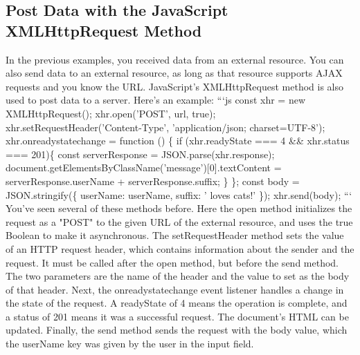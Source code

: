 \documentclass{article}%
\begin{document}
%
\subsection{Post Data with the JavaScript XMLHttpRequest Method}%
\label{subsec:PostDatawiththeJavaScriptXMLHttpRequestMethod}%
In the previous examples, you received data from an external resource. You can also send data to an external resource, as long as that resource supports AJAX requests and you know the URL.\newline%
JavaScript's XMLHttpRequest method is also used to post data to a server. Here's an example:\newline%
```js\newline%
const xhr = new XMLHttpRequest();\newline%
xhr.open('POST', url, true);\newline%
xhr.setRequestHeader('Content{-}Type', 'application/json; charset=UTF{-}8');\newline%
xhr.onreadystatechange = function () \{\newline%
  if (xhr.readyState === 4 \&\& xhr.status === 201)\{\newline%
    const serverResponse = JSON.parse(xhr.response);\newline%
    document.getElementsByClassName('message'){[}0{]}.textContent = serverResponse.userName + serverResponse.suffix;\newline%
  \}\newline%
\};\newline%
const body = JSON.stringify(\{ userName: userName, suffix: ' loves cats!' \});\newline%
xhr.send(body);\newline%
```\newline%
You've seen several of these methods before. Here the open method initializes the request as a "POST" to the given URL of the external resource, and uses the true Boolean to make it asynchronous.\newline%
The setRequestHeader method sets the value of an HTTP request header, which contains information about the sender and the request. It must be called after the open method, but before the send method. The two parameters are the name of the header and the value to set as the body of that header.\newline%
Next, the onreadystatechange event listener handles a change in the state of the request. A readyState of 4 means the operation is complete, and a status of 201 means it was a successful request. The document's HTML can be updated.\newline%
Finally, the send method sends the request with the body value, which the userName key was given by the user in the input field.\newline%
\end{document}
